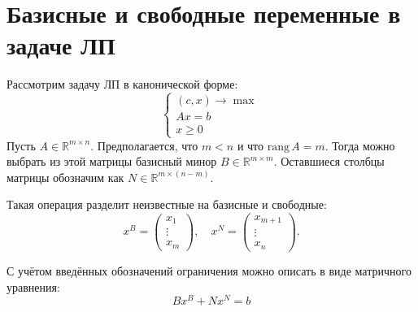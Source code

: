 \documentclass[17pt]{extarticle}
\begin{document}
\section{Базисные и свободные переменные в задаче ЛП}

Рассмотрим задачу ЛП в канонической форме:
\[
    \begin{cases}
        (c, x) \to \max \\
        A x = b         \\
        x \ge 0
    \end{cases}
\]
Пусть \( A \in \mathbb{R}^{m \times n} \). Предполагается, что \( m < n \) и что \( \text{rang}\, A = m \). Тогда можно выбрать из этой матрицы базисный минор \( B \in \mathbb{R}^{m \times m} \). Оставшиеся столбцы матрицы обозначим как \( N \in \mathbb{R}^{m \times (n - m)} \).

Такая операция разделит неизвестные на базисные и свободные:
\[
    x^B = \begin{pmatrix} x_1 \\ \vdots \\ x_m \end{pmatrix}, \quad
    x^N = \begin{pmatrix} x_{m+1} \\ \vdots \\ x_n \end{pmatrix}.
\]

С учётом введённых обозначений ограничения можно описать в виде матричного уравнения:
\[
    B x^B + N x^N = b
\]
\end{document}
